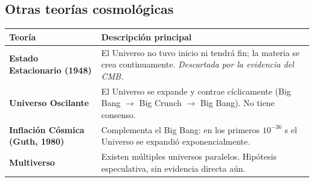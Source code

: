 \documentclass[11pt]{article}
\begin{document}
	\subsection{Otras teorías cosmológicas}
	\begin{center}
		\begin{tabular}{>{\bfseries}p{3.5cm} p{8cm}}
			\toprule
			Teor\'ia & Descripci\'on principal \\
			\midrule
			Estado Estacionario (1948) & El Universo no tuvo inicio ni tendr\'a fin; la materia se crea continuamente. \textit{Descartada por la evidencia del CMB.} \\[4pt]
			Universo Oscilante & El Universo se expande y contrae c\'iclicamente (Big Bang $\to$ Big Crunch $\to$ Big Bang). No tiene consenso. \\[4pt]
			Inflaci\'on C\'osmica (Guth, 1980) & Complementa el Big Bang: en los primeros $10^{-36}$ s el Universo se expandi\'o exponencialmente. \\[4pt]
			Multiverso & Existen m\'ultiples universos paralelos. Hip\'otesis especulativa, sin evidencia directa a\'un. \\
			\bottomrule
		\end{tabular}
	\end{center}
\end{document}
